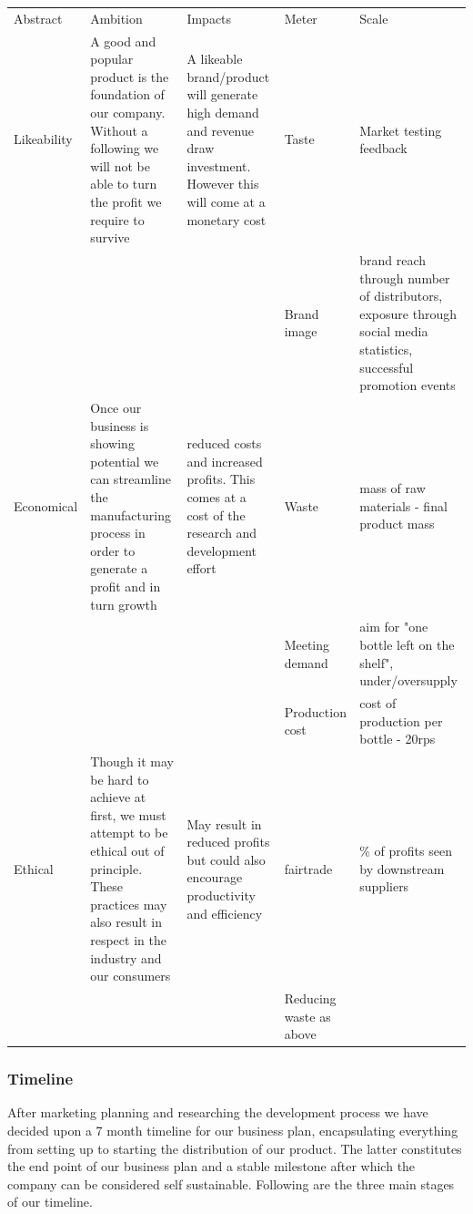 \documentclass[11pt]{article}
\begin{document}
  \begin{table}[H]
  \begin{center}
  \begin{tabular}{| p{7cm} | p{7cm} | p{7cm} | p{7cm} | p{7cm}}
  \hline
  Abstract & Ambition & Impacts & Meter & Scale\\
  Likeability & A good and popular product is the foundation of our company.
Without a following we will not be able to turn the profit we require to survive
 & A likeable brand/product will generate high demand and revenue draw
investment. However this will come at a monetary cost & Taste & Market testing feedback\\
  &&&Brand image & brand reach through number of distributors, exposure through
social media statistics, successful promotion events\\
  Economical & Once our business is showing potential we can streamline the
manufacturing process in order to generate a profit and in turn growth & reduced costs and increased profits. This comes at a cost of the research and development effort& Waste & mass of raw materials - final product mass \\ 
  &&&Meeting demand & aim for "one bottle left on the shelf",
under/oversupply\\
  &&&Production cost & cost of production per bottle - 20rps\\
  Ethical & Though it may be hard to achieve at first, we must attempt to be
ethical out of principle. These practices may also result in respect in the
industry and our consumers & May result in reduced profits but could also encourage
productivity and efficiency & fairtrade & \% of profits seen by downstream
suppliers\\
  &&&Reducing waste as above &
  \end{tabular}
  \end{center}
  \end{table}

  \subsubsection{Timeline}
After marketing planning and researching the development process we have decided upon a 7 month timeline for our business plan, encapsulating everything from setting up to starting the distribution of our product. The latter constitutes the end point of our business plan and a stable milestone after which the company can be considered self sustainable. Following are the three main stages of our timeline.
\end{document}
